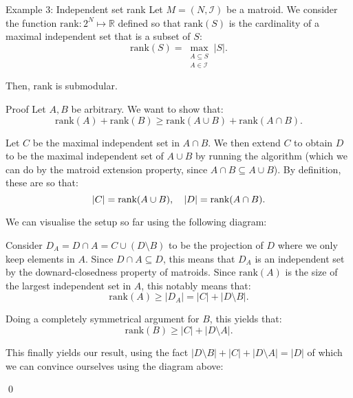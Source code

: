\documentclass[a4paper]{article}
\begin{document}
\begin{parag}{Example 3: Independent set rank}
    Let $M = \left(N, \mathcal{I}\right)$ be a matroid. We consider the function $\text{rank}: 2^N \mapsto \mathbb{R}$ defined so that $\text{rank}\left(S\right)$ is the cardinality of a maximal independent set that is a subset of $S$: 
    \[\text{rank}\left(S\right) = \max_{\substack{A \subseteq S \\ A \in \mathcal{I}}} \left|S\right|.\]
    
    Then, $\text{rank}$ is submodular.

    \begin{subparag}{Proof}
        Let $A, B$ be arbitrary. We want to show that: 
        \[\text{rank}\left(A\right) + \text{rank}\left(B\right) \geq \text{rank}\left(A \cup B\right) + \text{rank}\left(A \cap B\right).\]

        Let $C$ be the maximal independent set in $A \cap B$. We then extend $C$ to obtain $D$ to be the maximal independent set of $A \cup B$ by running the  algorithm (which we can do by the matroid extension property, since $A \cap B \subseteq A \cup B$). By definition, these are so that: 
        \[\left|C\right| = \text{rank}\left(A \cup B\right), \mathspace \left|D\right| = \text{rank}\left(A \cap B\right).\]

        We can visualise the setup so far using the following diagram:
        
        Consider $D_A = D \cap A = C \cup \left(D \setminus B\right)$ to be the projection of $D$ where we only keep elements in $A$. Since $D \cap A \subseteq D$, this means that $D_A$ is an independent set by the downard-closedness property of matroids. Since $\text{rank}\left(A\right)$ is the size of the largest independent set in $A$, this notably means that: 
        \[\text{rank}\left(A\right) \geq \left|D_A\right| = \left|C\right| + \left|D \setminus B\right|.\]
        
        Doing a completely symmetrical argument for $B$, this yields that: 
        \[\text{rank}\left(B\right) \geq \left|C\right| + \left|D \setminus A\right|.\]

        This finally yields our result, using the fact $\left|D \setminus B\right| + \left|C\right| + \left|D \setminus A\right| = \left|D\right|$ of which we can convince ourselves using the diagram above: 

        \qed
    \end{subparag}
\end{parag}
\end{document}
